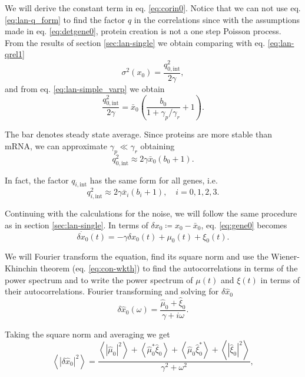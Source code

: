 We will derive the constant term in eq. \eqref{eq:corin0}. Notice that we can not use eq. \eqref{eq:lan-q_form} to find the factor $q$ in the correlations since with the assumptions made in eq. \eqref{eq:detgene0}, protein creation is not a one step Poisson process. From the results of section \ref{sec:lan-single} we obtain comparing with eq. \eqref{eq:lan-qrel1}
\begin{equation*}
  \sigma^2(x_0) = \frac{q_{0,\text{int}}^2}{2\gamma},
\end{equation*}
and from eq. \eqref{eq:lan-simple_varp} we obtain
\begin{equation*}
  \frac{q_{0,\text{int}}^2}{2\gamma}=\bar{x}_0\left(\frac{b_0}{1+\gamma_p/\gamma_r}+1\right).
\end{equation*}

The bar denotes steady state average. Since proteins are more stable than mRNA, we can approximate $\gamma_p\ll\gamma_r$ obtaining
\begin{equation*}
  q_{0,\text{int}}^2 \approx 2\gamma\bar{x}_0(b_0+1).
\end{equation*}

In fact, the factor $q_{i,\text{int}}$ has the same form for all genes, i.e.
\begin{equation*}
  q_{i,\text{int}}^2 \approx 2\gamma\bar{x}_i(b_i+1),\quad i = 0,1,2,3.
\end{equation*}

Continuing with the calculations for the noise, we will follow the same procedure as in section \ref{sec:lan-single}. In terms of $\delta x_0 \coloneqq x_0 - \bar{x}_0$, eq. \eqref{eq:gene0} becomes
\begin{equation*}
\dot{\delta x_0}(t) = -\gamma \delta x_0(t) + \mu_0(t) + \xi_0(t).
\end{equation*}

We will Fourier transform the equation, find its square norm and use the Wiener-Khinchin theorem (eq. \eqref{eq:con-wkth}) to find the autocorrelations in terms of the power spectrum and to write the power spectrum of $\mu(t)$ and $\xi(t)$ in terms of their autocorrelations. Fourier transforming and solving for $\delta \hat{x}_0$
\begin{equation}
\label{eq:fgene0}
\delta \hat{x}_0(\omega) = \frac{\hat{\mu}_0+\hat{\xi}_0}{\gamma + i\omega}.
\end{equation}

Taking the square norm and averaging we get
\begin{equation*}
\left\langle |\delta \hat{x}_0|^2 \right\rangle = \frac{\left\langle|\hat{\mu}_0|^2\right\rangle + \left\langle\hat{\mu}_0^*\hat{\xi}_0\right\rangle+\left\langle\hat{\mu}_0\hat{\xi}_0^*\right\rangle+\left\langle|\hat{\xi}_0|^2\right\rangle}{\gamma^2 + \omega^2},
\end{equation*}

